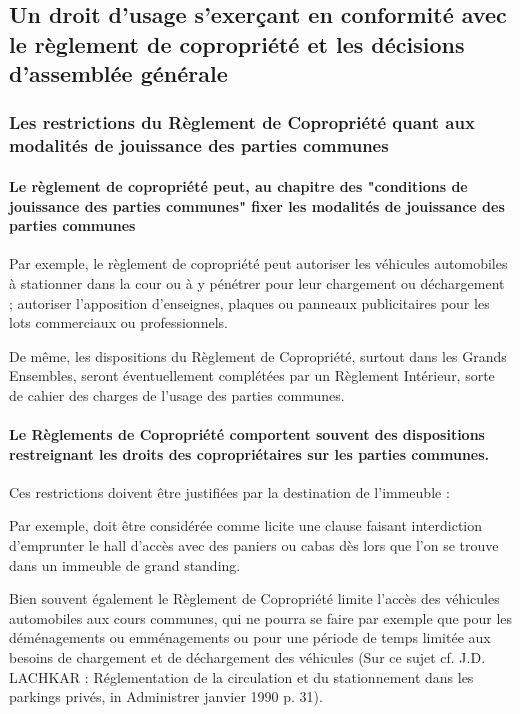 	\subsection{Un droit d’usage s’exerçant en conformité avec le règlement de copropriété et les décisions d’assemblée générale}\label{07_III_B}
		
		\subsubsection{Les restrictions du Règlement de Copropriété quant aux modalités de jouissance des parties communes}
		
			\paragraph{Le règlement de copropriété peut, au chapitre des "conditions de jouissance des parties communes" fixer les modalités de jouissance des parties communes}
			
				Par exemple, le règlement de copropriété peut autoriser les véhicules automobiles à stationner dans la cour ou à y pénétrer pour leur chargement ou déchargement ; autoriser l'apposition d'enseignes, plaques ou panneaux publicitaires pour les lots commerciaux ou professionnels.
				
				De même, les dispositions du Règlement de Copropriété, surtout dans les Grands Ensembles, seront éventuellement complétées par un Règlement Intérieur, sorte de cahier des charges de l'usage des parties communes.
		
			\paragraph{Le Règlements de Copropriété comportent souvent des dispositions restreignant les droits des copropriétaires sur les parties communes.}
			
				Ces restrictions doivent être justifiées par la destination de l'immeuble :
				
				Par exemple, doit être considérée comme licite une clause faisant interdiction d'emprunter le hall d'accès avec des paniers ou cabas dès lors que l'on se trouve dans un immeuble de grand standing.
				
				Bien souvent également le Règlement de Copropriété limite l'accès des véhicules automobiles aux cours communes, qui ne pourra se faire par exemple que pour les déménagements ou emménagements ou pour une période de temps limitée aux besoins de chargement et de déchargement des véhicules (Sur ce sujet cf. J.D. LACHKAR : Réglementation de la circulation et du stationnement dans les parkings privés, in Administrer janvier 1990 p. 31).
			
